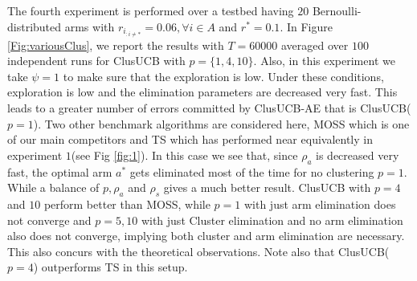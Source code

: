 	The fourth experiment is performed over a testbed having $20$ Bernoulli-distributed arms with $r_{i_{:{{i}\neq {*}}}}=0.06,\forall i\in A$ and $r^{*}=0.1$. In Figure \ref{Fig:variousClus}, we report the results with $T=60000$ averaged over $100$ independent runs for ClusUCB with  $p=\lbrace 1,4,10\rbrace$. Also, in this experiment we take $\psi = 1$ to make sure that the exploration is low. Under these conditions, exploration is low and the elimination parameters are decreased very fast. This leads to a greater number of errors committed by ClusUCB-AE that is ClusUCB($p=1$). Two other benchmark algorithms are considered here, MOSS which is one of our main competitors and TS which has performed near equivalently in experiment $1$(see Fig \ref{fig:1}). In this case we see that, since $\rho_{a}$ is decreased very fast, the optimal arm $a^{*}$ gets eliminated most of the time for no clustering $p=1$. While a balance of $p,\rho_{a}$ and $\rho_{s}$ gives a much better result. ClusUCB with $p=4$ and $10$ 
perform better than MOSS, while $p=1$ with just arm elimination does not converge and $p=5,10$ with just Cluster elimination and no arm elimination also does not converge, implying both cluster and arm elimination are necessary. This also concurs with the theoretical observations. Note also that ClusUCB($p=4$) outperforms TS in this setup.	

